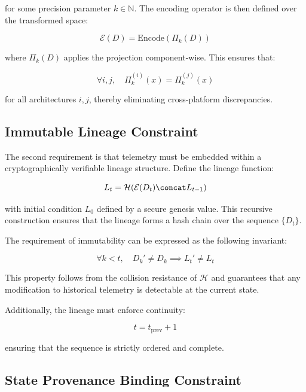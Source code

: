 for some precision parameter $k \in \mathbb{N}$. The encoding operator is then defined over the transformed space:

\begin{equation}
\mathcal{E}(D) = \text{Encode}(\Pi_k(D))
\end{equation}

where $\Pi_k(D)$ applies the projection component-wise. This ensures that:

\begin{equation}
\forall i,j, \quad \Pi_k^{(i)}(x) = \Pi_k^{(j)}(x)
\end{equation}

for all architectures $i,j$, thereby eliminating cross-platform discrepancies.

\subsection{Immutable Lineage Constraint}

The second requirement is that telemetry must be embedded within a cryptographically verifiable lineage structure. Define the lineage function:

\begin{equation}
L_t = \mathcal{H}(\mathcal{E}(D_t) \concat L_{t-1})
\end{equation}

with initial condition $L_0$ defined by a secure genesis value. This recursive construction ensures that the lineage forms a hash chain over the sequence $\{D_t\}$.

The requirement of immutability can be expressed as the following invariant:

\begin{equation}
\forall k < t, \quad D_k' \neq D_k \implies L_t' \neq L_t
\end{equation}

This property follows from the collision resistance of $\mathcal{H}$ and guarantees that any modification to historical telemetry is detectable at the current state.

Additionally, the lineage must enforce continuity:

\begin{equation}
t = t_{\text{prev}} + 1
\end{equation}

ensuring that the sequence is strictly ordered and complete.

\subsection{State Provenance Binding Constraint}

